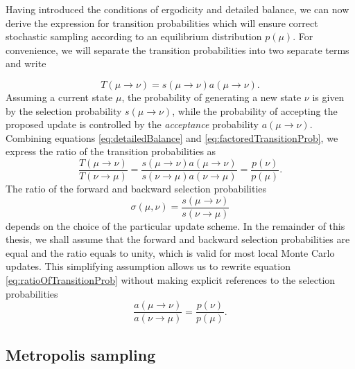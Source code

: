 \documentclass[12pt]{report}
\begin{document}
Having introduced the conditions of ergodicity and detailed balance, we can now derive the expression for transition probabilities which will ensure correct stochastic sampling according to an equilibrium distribution $p\left(\mu\right)$. 
For convenience, we will separate the transition probabilities into two separate terms and write


%
\begin{equation}
\label{eq:factoredTransitionProb}
T\left(\mu \rightarrow \nu\right) = s\left(\mu \rightarrow \nu\right)a\left(\mu \rightarrow \nu\right).
\end{equation}
Assuming a current state $\mu$, the probability of generating a new state $\nu$ is given by the selection probability $s\left(\mu \rightarrow \nu\right)$, while the probability of accepting the proposed update is controlled by the \textit{acceptance} probability $a\left(\mu \rightarrow \nu\right)$. Combining equations \ref{eq:detailedBalance} and \ref{eq:factoredTransitionProb}, we express the ratio of the transition probabilities as
%
\begin{equation}
\label{eq:ratioOfTransitionProb}
\frac{T\left(\mu \rightarrow \nu\right)}{T\left(\nu \rightarrow \mu\right)} = \frac{s\left(\mu \rightarrow \nu\right)a\left(\mu \rightarrow \nu\right)}{s\left(\nu \rightarrow \mu\right)a\left(\nu \rightarrow \mu\right)} = \frac{p\left(\nu\right)}{p\left(\mu\right)}.
\end{equation}
%
The ratio of the forward and backward selection probabilities
\begin{equation}
\sigma(\mu,\nu) = \frac{s\left(\mu \rightarrow \nu\right)}{s\left(\nu \rightarrow \mu\right)}
\end{equation}
depends on the choice of the particular update scheme. In the remainder of this thesis, we shall assume that the forward and backward selection probabilities are equal and the ratio equals to unity, which is valid for most local Monte Carlo updates. This simplifying assumption allows us to rewrite equation \ref{eq:ratioOfTransitionProb} without making explicit references to the selection probabilities
%
\begin{equation}
\label{eq:acceptanceProbs}
\frac{a\left(\mu \rightarrow \nu\right)}{a\left(\nu \rightarrow \mu\right)} = \frac{p\left(\nu\right)}{p\left(\mu\right)}.
\end{equation}
%

\subsection{Metropolis sampling}
\end{document}
